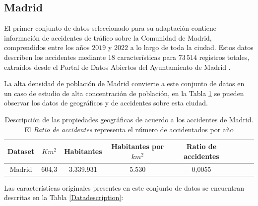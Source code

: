 \subsection*{Madrid}

El primer conjunto de datos seleccionado para su adaptación contiene información de accidentes de tráfico sobre la Comunidad de Madrid, comprendidos entre los años $2019$ y $2022$ a lo largo de toda la ciudad. Estos datos describen los accidentes mediante 18 características para $73\,514$ registros totales, extraídos desde el Portal de Datos Abiertos del Ayuntamiento de Madrid \cite{InfoDatasetMadrid}. 

La alta densidad de población de Madrid convierte a este conjunto de datos en un caso de estudio de alta concentración de población, en la Tabla \ref{Madrid_statistics} se pueden observar los datos de geográficos y de accidentes sobre esta ciudad.

\begin{table}[ht]
	\caption[Descripción de las propiedades geográficas de acuerdo a los accidentes de Madrid]{Descripción de las propiedades geográficas de acuerdo a los accidentes de Madrid. El \textit{Ratio de accidentes} representa el número de accidentados por año}
	\begin{center}
		\begin{tabular}{|c|c||c|c|c|c|c|c|}
			\hline
			\textbf{Dataset} & \textbf{$Km^2$} & \textbf{Habitantes} & \textbf{Habitantes por $km^2$} & \textbf{Ratio de accidentes}
			\\ \hline \hline
			
			Madrid & 604,3 & 3.339.931 & 5.530 & 0,0055 \\ \hline
			
		\end{tabular}
	\end{center}
	\label{Madrid_statistics}
\end{table}

Las características originales presentes en este conjunto de datos se encuentran descritas en la Tabla \ref{Datadescription}:

